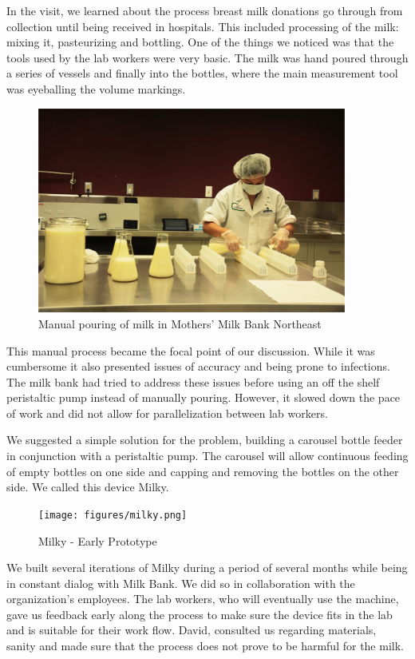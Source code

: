 In the visit, we learned about the process breast milk donations go through from collection until being received in hospitals. This included processing of the milk: mixing it, pasteurizing and bottling. One of the things we noticed was that the tools used by the lab workers were very basic. The milk was hand poured through a series of vessels and finally into the bottles, where the main measurement tool was eyeballing the volume markings. 

   \begin{figure}[thpb]
      \centering
      \includegraphics[width=4in]{figures/mmne-manual.png}
      \caption{Manual pouring of milk in Mothers' Milk Bank Northeast}
      \label{mmne-manual}
   \end{figure}

This manual process became the focal point of our discussion. While it was cumbersome it also presented issues of accuracy and being prone to infections. The milk bank had tried to address these issues before using an off the shelf peristaltic pump instead of manually pouring. However, it slowed down the pace of work and did not allow for parallelization between lab workers. 

We suggested a simple solution for the problem, building a carousel bottle feeder in conjunction with a peristaltic pump. The carousel will allow continuous feeding of empty bottles on one side and capping and removing the bottles on the other side. We called this device Milky. 

   \begin{figure}[thpb]
      \centering
      \texttt{[image: figures/milky.png]}
      \caption{Milky - Early Prototype}
      \label{milky}
   \end{figure}

We built several iterations of Milky during a period of several months while being in constant dialog with Milk Bank. We did so in collaboration with the organization's employees. The lab workers, who will eventually use the machine, gave us feedback early along the process to make sure the device fits in the lab and is suitable for their work flow. David, consulted us regarding materials, sanity and made sure that the process does not prove to be harmful for the milk. 

